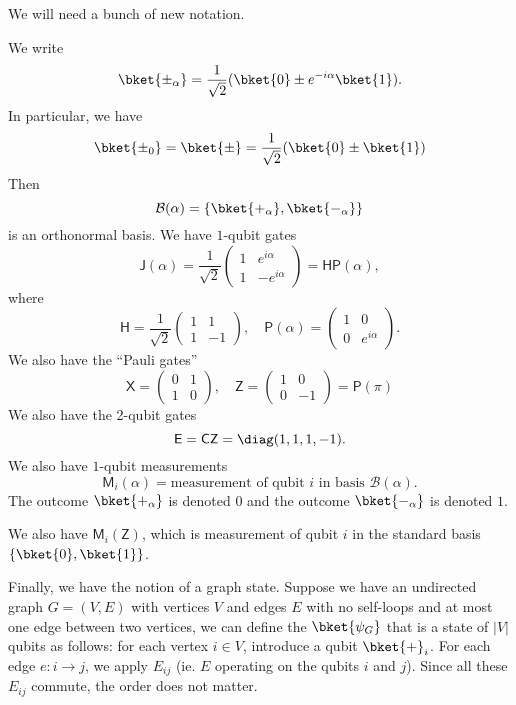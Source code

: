 \documentclass[a4paper]{article}
\newcommand{\qCZ}{\mathsf{CZ}}
\newcommand{\qE}{\mathsf{E}}
\newcommand{\qJ}{\mathsf{J}}
\newcommand{\qM}{\mathsf{M}}
\newcommand{\qH}{\mathsf{H}}
\newcommand{\qP}{\mathsf{P}}
\newcommand{\qX}{\mathsf{X}}
\newcommand{\qZ}{\mathsf{Z}}
\begin{document}
We will need a bunch of new notation.
\begin{notation}
  We write
  \[
    \bket{\pm_\alpha} = \frac{1}{\sqrt{2}} (\bket{0} \pm e^{-i\alpha} \bket{1}).
  \]
  In particular, we have
  \[
    \bket{\pm_0} = \bket{\pm} = \frac{1}{\sqrt{2}}(\bket{0} \pm \bket{1})
  \]
  Then
  \[
    \mathcal{B}(\alpha) = \{\bket{+_\alpha}, \bket{-_\alpha}\}
  \]
  is an orthonormal basis. We have $1$-qubit gates
  \[
    \qJ(\alpha) = \frac{1}{\sqrt{2}}
    \begin{pmatrix}
      1 & e^{i\alpha}\\
      1 & -e^{i\alpha}
    \end{pmatrix} = \qH \qP(\alpha),
  \]
  where
  \[
    \qH = \frac{1}{\sqrt{2}}
    \begin{pmatrix}
      1 & 1\\
      1 & -1
    \end{pmatrix},\quad \qP(\alpha) =
    \begin{pmatrix}
      1 & 0\\
      0 & e^{i\alpha}
    \end{pmatrix}.
  \]
  We also have the ``Pauli gates''
  \[
    \qX=
    \begin{pmatrix}
      0 & 1\\
      1 & 0
    \end{pmatrix},\quad
    \qZ =
    \begin{pmatrix}
      1 & 0\\
      0 & -1
    \end{pmatrix} = \qP(\pi)
  \]
  We also have the 2-qubit gates
  \[
    \qE = \qCZ = \diag(1, 1, 1, -1).
  \]
  We also have $1$-qubit measurements
  \[
    \qM_i(\alpha) = \text{measurement of qubit $i$ in basis $\mathcal{B}(\alpha)$}.
  \]
  The outcome $\bket{+_\alpha}$ is denoted $0$ and the outcome $\bket{-_\alpha}$ is denoted $1$.

  We also have $\qM_i(\qZ)$, which is measurement of qubit $i$ in the standard basis $\{\bket{0}, \bket{1}\}$.

  Finally, we have the notion of a graph state. Suppose we have an undirected graph $G = (V, E)$ with vertices $V$ and edges $E$ with no self-loops and at most one edge between two vertices, we can define the  $\bket{\psi_G}$ that is a state of $|V|$ qubits as follows: for each vertex $i \in V$, introduce a qubit $\bket{+}_i$. For each edge $e: i \to j$, we apply $E_{ij}$ (ie. $E$ operating on the qubits $i$ and $j$). Since all these $E_{ij}$ commute, the order does not matter.


\end{notation}
\end{document}
